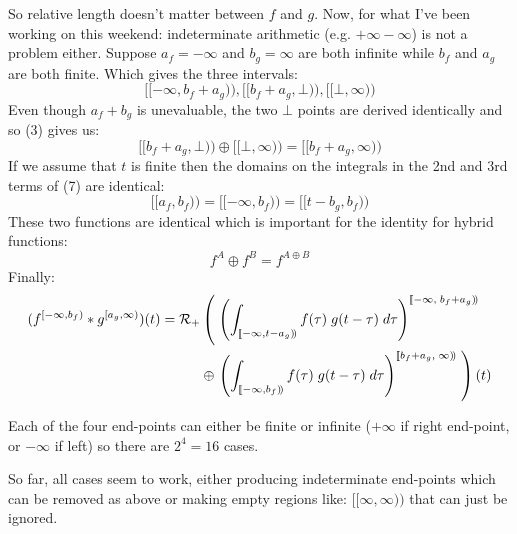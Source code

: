 \documentclass{letter}
\begin{document}
	So relative length doesn't matter between $f$ and $g$.
	Now, for what I've been working on this weekend: indeterminate arithmetic (e.g. $+\infty-\infty$) 
	is not a problem either.
	Suppose $a_f = -\infty$ and $b_g = \infty$ are both infinite while $b_f$ and $a_g$ are both finite.
	Which gives the three intervals:
	\begin{equation}
		[\![-\infty, b_f+a_g )\!), [\![ b_f+a_g, \bot )\!), [\![\bot, \infty )\!)
	\end{equation}
	Even though $a_f+b_g$ is unevaluable, the two $\bot$ points are derived identically and so (3) gives us:
	\begin{equation}
		[\![ b_f+a_g, \bot )\!) \oplus [\![\bot, \infty )\!) = [\![b_f+a_g, \infty)\!)
	\end{equation}
	If we assume that $t$ is finite then the domains on the integrals in the 2nd and 3rd terms of (7) are identical:
	\begin{equation}
		[\![a_f, b_f)\!) = [\![-\infty, b_f )\!) = [\![t-b_g, b_f)\!)
	\end{equation}
	These two functions are identical which is important for the identity for hybrid functions: 
	\begin{equation}
		f^A \oplus f^B = f^{A \oplus B}
	\end{equation}
	Finally:
		\begin{align}
	(f^{[-\infty, b_f)} * g^{[a_g, \infty)})(t) = 
		\mathcal{R}_+ &\left( \; \left( 
			\int_{[\![ -\infty, t-a_g)\!)} f(\tau) \; g(t-\tau) \; d\tau \right)^{[\![-\infty,\; b_f+a_g)\!)} 
				\right. \notag \\ &\oplus \left. \left( 
			\int_{[\![ -\infty, b_f )\!)} f(\tau) \; g(t-\tau) \; d\tau \right)^{[\![b_f+a_g,\; \infty)\!)} 
				\; \right)(t)
	\end{align}
	
	Each of the four end-points can either be finite or infinite ($+\infty$ if right end-point, or $-\infty$ if left) so there are
	$2^4=16$ cases.
	
	So far, all cases seem to work, either producing indeterminate end-points which can be removed as above or making 
	empty regions like: $[\![\infty, \infty )\!)$ that can just be ignored. 
	
	
\end{document}
